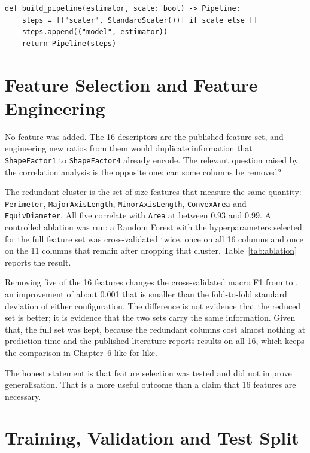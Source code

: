 \begin{lstlisting}[style=pycode, caption={Pipeline construction: the scaler is
fitted inside cross-validation, never before it.}, label={lst:pipeline}]
def build_pipeline(estimator, scale: bool) -> Pipeline:
    steps = [("scaler", StandardScaler())] if scale else []
    steps.append(("model", estimator))
    return Pipeline(steps)
\end{lstlisting}

\section{Feature Selection and Feature Engineering}

No feature was added. The 16 descriptors are the published feature set, and
engineering new ratios from them would duplicate information that
\texttt{ShapeFactor1} to \texttt{ShapeFactor4} already encode. The relevant
question raised by the correlation analysis is the opposite one: can some columns
be removed?

The redundant cluster is the set of size features that measure the same
quantity: \texttt{Perimeter}, \texttt{MajorAxisLength}, \texttt{MinorAxisLength},
\texttt{ConvexArea} and \texttt{EquivDiameter}. All five correlate with
\texttt{Area} at between 0.93 and 0.99. A controlled ablation was run: a Random
Forest with the hyperparameters selected for the full feature set was
cross-validated twice, once on all 16 columns and once on the 11 columns that
remain after dropping that cluster. Table~\ref{tab:ablation} reports the result.



Removing five of the 16 features changes the cross-validated macro F1 from
\AblationFull{} to \AblationReduced{}, an improvement of about 0.001 that is
smaller than the fold-to-fold standard deviation of either configuration. The
difference is not evidence that the reduced set is better; it is evidence that the
two sets carry the same information. Given that, the full set was kept, because
the redundant columns cost almost nothing at prediction time and the published
literature reports results on all 16, which keeps the comparison in Chapter~6
like-for-like.

The honest statement is that feature selection was tested and did not improve
generalisation. That is a more useful outcome than a claim that 16 features are
necessary.

\section{Training, Validation and Test Split}

